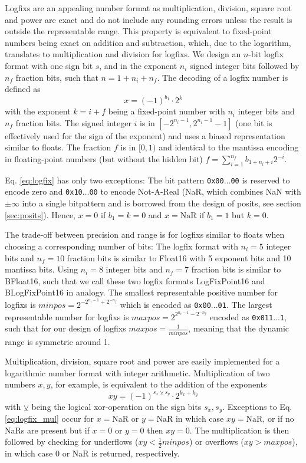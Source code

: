 Logfixs are an appealing number format as multiplication, division, square root and power are exact and do not include any rounding
errors unless the result is outside the representable range. This property is equivalent to fixed-point numbers being exact
on addition and subtraction, which, due to the logarithm, translates to multiplication and division for logfixs. We design an $n$-bit logfix
format with one sign bit $s$, and in the exponent $n_i$ signed integer bits followed by $n_f$ fraction bits,
such that $n = 1 + n_i + n_f$. The decoding of a logfix number is defined as
\begin{equation}
x = (-1)^{b_1} \cdot 2^k
\label{eq:logfix}
\end{equation}
with the exponent $k = i + f$ being a fixed-point number with $n_i$ integer bits and $n_f$ fraction bits. The signed integer $i$
is in $[-2^{n_i-1},2^{n_i-1}-1]$ (one bit is effectively used for the sign of the exponent) and uses a biased representation similar
to floats. The fraction $f$ is in $[0,1)$ and identical to the mantissa encoding in floating-point numbers (but without the hidden bit)
$f = \sum_{i=1}^{n_f} b_{1+n_i+i} 2^{-i}$.

Eq. \ref{eq:logfix} has only two exceptions: The bit pattern \texttt{0x00$\dots$00} is reserved to encode zero and \texttt{0x10$\dots$00}
to encode Not-A-Real (NaR, which combines NaN with $\pm \infty$ into a single bitpattern and is borrowed from the design of
posits, see section \ref{sec:posits}). Hence, $x=0$ if $b_1 = k = 0$ and $x = \text{NaR}$ if $b_1 = 1$ but $k=0$.

The trade-off between precision and range is for logfixs similar to floats when choosing a corresponding number of bits:
The logfix format with $n_i=5$ integer bits and $n_f=10$ fraction bits is similar to Float16 with 5
exponent bits and 10 mantissa bits. Using $n_i=8$ integer bits and $n_f=7$ fraction bits is similar to BFloat16, such that
we call these two logfix formats LogFixPoint16 and BLogFixPoint16 in analogy. The smallest representable positive number
for logfixs is $minpos = 2^{-2^{n_i-1} + 2^{-n_f}}$ which is encoded as \texttt{0x00$...$01}. The largest representable number
for logfixs is $maxpos = 2^{2^{n_i-1} - 2^{-n_f}}$ encoded as \texttt{0x011$...$1}, such that for our design of logfixs $maxpos = \tfrac{1}{minpos}$, meaning that
the dynamic range is symmetric around 1.


Multiplication, division, square root and power are easily implemented for a logarithmic number format with integer arithmetic. 
Multiplication of two numbers $x,y$, for example, is equivalent to the addition of the exponents
\begin{equation}
xy = (-1)^{s_x \veebar s_y} \cdot 2^{k_x + k_y}
\label{eq:logfix_mul}
\end{equation}
with $\veebar$ being the logical xor-operation on the sign bits $s_x,s_y$. Exceptions to Eq. \ref{eq:logfix_mul} occur for $x = \text{NaR}$
or $y = \text{NaR}$ in which case $xy = \text{NaR}$, or if no NaRs are present but if $x=0$ or $y=0$ then $xy= 0$. The multiplication 
is then followed by checking for underflows ($xy < \tfrac{1}{2}minpos$) or overflows ($xy > maxpos$), in which case 0 or NaR is returned,
respectively. 

